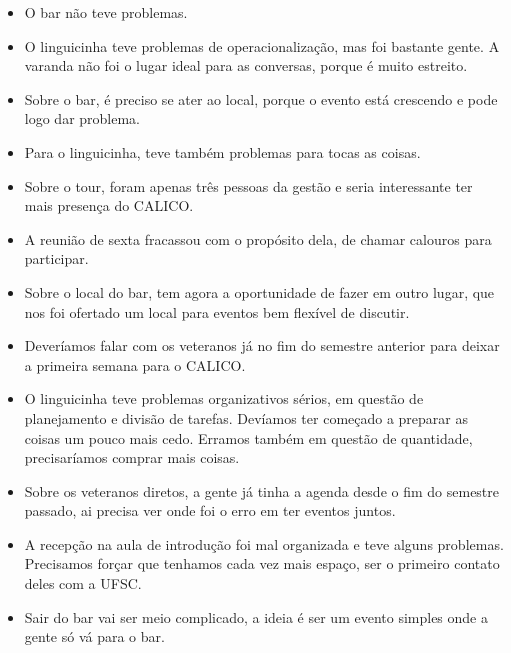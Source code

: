 \documentclass{ata-calico}
\begin{document}
\begin{itemize}
\item O bar não teve problemas.
\item O linguicinha teve problemas de operacionalização, mas foi bastante gente. A varanda não foi o lugar ideal para as conversas, porque é muito estreito.
\item Sobre o bar, é preciso se ater ao local, porque o evento está crescendo e pode logo dar problema.
\item Para o linguicinha, teve também problemas para tocas as coisas.
\item Sobre o tour, foram apenas três pessoas da gestão e seria interessante ter mais presença do CALICO.
\item A reunião de sexta fracassou com o propósito dela, de chamar calouros para participar.
\item Sobre o local do bar, tem agora a oportunidade de fazer em outro lugar, que nos foi ofertado um local para eventos bem flexível de discutir.
\item Deveríamos falar com os veteranos já no fim do semestre anterior para deixar a primeira semana para o CALICO.
\item O linguicinha teve problemas organizativos sérios, em questão de planejamento e divisão de tarefas. Devíamos ter começado a preparar as coisas um pouco mais cedo. Erramos também em questão de quantidade, precisaríamos comprar mais coisas.
\item Sobre os veteranos diretos, a gente já tinha a agenda desde o fim do semestre passado, ai precisa ver onde foi o erro em ter eventos juntos.
\item A recepção na aula de introdução foi mal organizada e teve alguns problemas. Precisamos forçar que tenhamos cada vez mais espaço, ser o primeiro contato deles com a UFSC.
\item Sair do bar vai ser meio complicado, a ideia é ser um evento simples onde a gente só vá para o bar.
\end{itemize}

\end{document}
